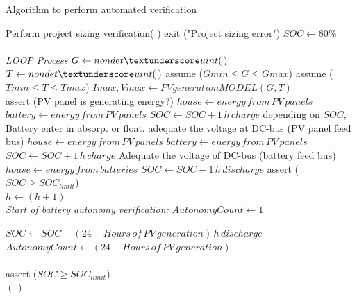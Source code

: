 \documentclass[journal]{IEEEtran}
\begin{document}
 \begin{algorithm}
 \caption{Algorithm to perform automated verification}
 \begin{algorithmic}[1]
 \renewcommand{\algorithmicrequire}{\textbf{Input:}}
 \renewcommand{\algorithmicensure}{\textbf{Output:}}
  \STATE Perform project sizing verification( )
  \STATE exit ("Project sizing error")  
  \ENDIF
  \STATE $SOC \leftarrow 80\%$ \\
 \\ \textit{LOOP Process}
  \STATE $G \leftarrow nondet \textunderscore uint(\,)$ 
  \STATE $T \leftarrow nondet \textunderscore uint(\,)$ 
  \STATE assume ($Gmin \leq G \leq Gmax$) 
  \STATE assume ($Tmin \leq T \leq Tmax$) 
  \STATE $Imax, Vmax \leftarrow PVgenerationMODEL (G,T)$ 
  \\
    \STATE assert (PV panel is generating energy?) 
    \STATE $house \leftarrow energy \, from \, PV \, panels$
    \STATE $battery \leftarrow energy \, from \, PV \, panels$ 
    \STATE $SOC \leftarrow SOC + 1\,h\, charge$
  	\STATE depending on $SOC$, Battery enter in absorp. or float.
	\STATE adequate the voltage at DC-bus (PV panel feed bus)
    \STATE $house \leftarrow energy \, from \, PV \, panels$
    \STATE $battery \leftarrow energy \, from \, PV \, panels$ 
    \STATE $SOC \leftarrow SOC + 1\,h\, charge$
  \ELSE
  	\STATE Adequate the voltage of DC-bus (battery feed bus)
	\STATE $house \leftarrow energy \, from \, batteries$
    \STATE $SOC \leftarrow SOC - 1\,h\, discharge$
    \STATE assert ($SOC \geq SOC_{limit}$)
    \\
  \ENDIF
  \STATE $h \leftarrow (h+1)$
  \ENDFOR
 \\ \textit{Start of battery autonomy verification:}
\STATE $AutonomyCount \leftarrow 1$

  \STATE $SOC \leftarrow SOC - ( 24 - Hours \, of \, PV \, generation)\,h\, discharge$
  \STATE $AutonomyCount \leftarrow ( 24 - Hours \, of \, PV \, generation)$
  \\  
  \\
  \STATE assert ($SOC \geq SOC_{limit}$)  
  \\
  \ENDWHILE
 \RETURN $(\,)$ 
 \end{algorithmic} 
 \label{alg:verification-algorithm}
 \end{algorithm}
\end{document}
